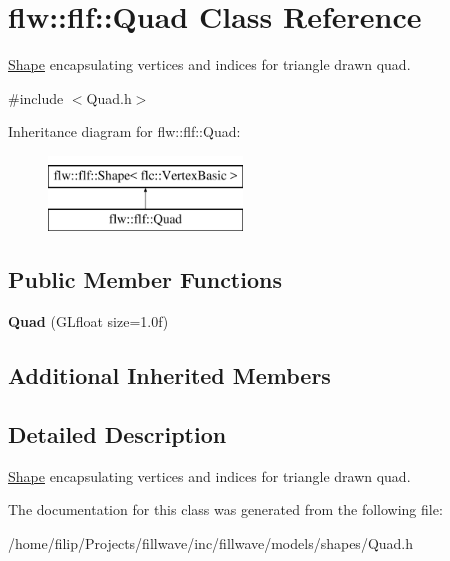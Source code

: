 \hypertarget{classflw_1_1flf_1_1Quad}{}\section{flw\+:\+:flf\+:\+:Quad Class Reference}
\label{classflw_1_1flf_1_1Quad}


\hyperlink{classflw_1_1flf_1_1Shape}{Shape} encapsulating vertices and indices for triangle drawn quad.  




{\ttfamily \#include $<$Quad.\+h$>$}

Inheritance diagram for flw\+:\+:flf\+:\+:Quad\+:\begin{figure}[H]
\begin{center}
\leavevmode
\includegraphics[height=2.000000cm]{classflw_1_1flf_1_1Quad}
\end{center}
\end{figure}
\subsection*{Public Member Functions}
\begin{DoxyCompactItemize}
\item 
{\bfseries Quad} (G\+Lfloat size=1.\+0f)\hypertarget{classflw_1_1flf_1_1Quad_a34f140e3bdad89dfb40242c0c09a0fda}{}\label{classflw_1_1flf_1_1Quad_a34f140e3bdad89dfb40242c0c09a0fda}

\end{DoxyCompactItemize}
\subsection*{Additional Inherited Members}


\subsection{Detailed Description}
\hyperlink{classflw_1_1flf_1_1Shape}{Shape} encapsulating vertices and indices for triangle drawn quad. 

The documentation for this class was generated from the following file\+:\begin{DoxyCompactItemize}
\item 
/home/filip/\+Projects/fillwave/inc/fillwave/models/shapes/Quad.\+h\end{DoxyCompactItemize}
